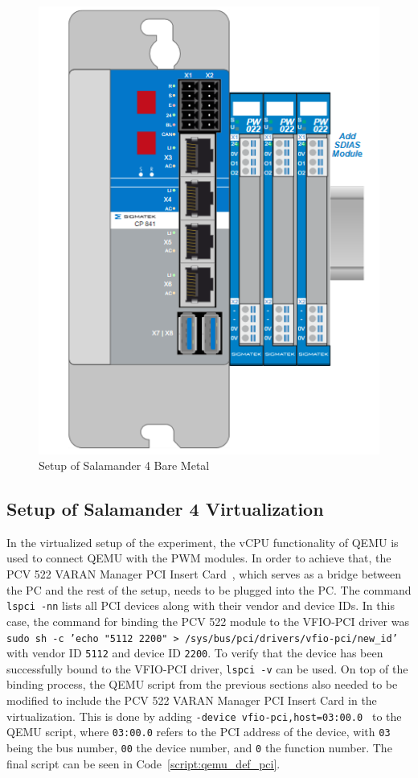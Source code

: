 \documentclass[MMR,Master,english]{twbook}
\begin{document}
\begin{figure}[H]
	\centering
	\includegraphics[width=0.45\columnwidth]{img/experiment/hardware_tree.png}
	\caption[Setup of Salamander 4 Bare Metal]{Setup of Salamander 4 Bare Metal}
	\label{fig:hardware_tree}
\end{figure}

\subsection{Setup of Salamander 4 Virtualization}\label{subsec:setup_experiment_virtualized}
In the virtualized setup of the experiment, the vCPU functionality of QEMU is used to connect QEMU with the PWM modules. In order to achieve that, the PCV 522 VARAN Manager PCI Insert Card~\cite{ControlsHMIsSIGMATEK}, which serves as a bridge between the PC and the rest of the setup, needs to be plugged into the PC. The command \texttt{lspci -nn} lists all PCI devices along with their vendor and device IDs. In this case, the command for binding the PCV 522 module to the VFIO-PCI driver was \texttt{sudo sh -c 'echo "5112 2200" > /sys/bus/pci/drivers/vfio-pci/new\_id'} with vendor ID \texttt{5112} and device ID \texttt{2200}.  To verify that the device has been successfully bound to the VFIO-PCI driver, \texttt{lspci -v} can be used. On top of the binding process, the QEMU script from the previous sections also needed to be modified to include the PCV 522 VARAN Manager PCI Insert Card in the virtualization. This is done by adding \texttt{-device\ vfio-pci,host=03:00.0 } to the QEMU script, where \texttt{03:00.0} refers to the PCI address of the device, with \texttt{03} being the bus number, \texttt{00} the device number, and \texttt{0} the function number. The final script can be seen in Code~\ref{script:qemu_def_pci}.
\end{document}
